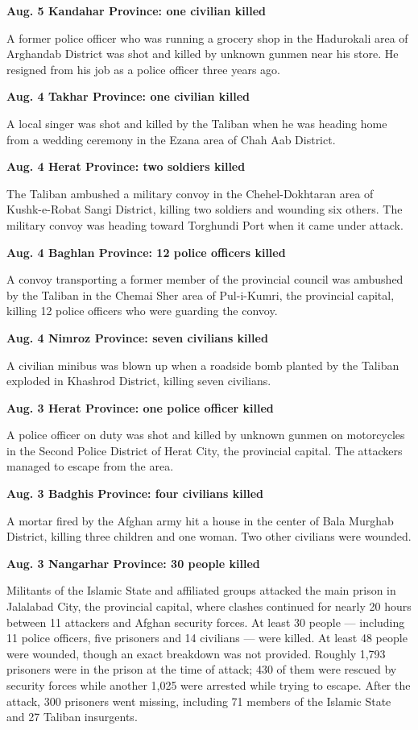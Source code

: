 \textbf{Aug. 5 Kandahar Province: one civilian killed}

A former police officer who was running a grocery shop in the Hadurokali
area of Arghandab District was shot and killed by unknown gunmen near
his store. He resigned from his job as a police officer three years ago.

\textbf{Aug. 4 Takhar Province: one civilian killed}

A local singer was shot and killed by the Taliban when he was heading
home from a wedding ceremony in the Ezana area of Chah Aab District.

\textbf{Aug. 4 Herat Province: two soldiers killed}

The Taliban ambushed a military convoy in the Chehel-Dokhtaran area of
Kushk-e-Robat Sangi District, killing two soldiers and wounding six
others. The military convoy was heading toward Torghundi Port when it
came under attack.

\textbf{Aug. 4 Baghlan Province: 12 police officers killed}

A convoy transporting a former member of the provincial council was
ambushed by the Taliban in the Chemai Sher area of Pul-i-Kumri, the
provincial capital, killing 12 police officers who were guarding the
convoy.

\textbf{Aug. 4 Nimroz Province: seven civilians killed}

A civilian minibus was blown up when a roadside bomb planted by the
Taliban exploded in Khashrod District, killing seven civilians.

\textbf{Aug. 3 Herat Province: one police officer killed}

A police officer on duty was shot and killed by unknown gunmen on
motorcycles in the Second Police District of Herat City, the provincial
capital. The attackers managed to escape from the area.

\textbf{Aug. 3 Badghis Province: four civilians killed}

A mortar fired by the Afghan army hit a house in the center of Bala
Murghab District, killing three children and one woman. Two other
civilians were wounded.

\textbf{Aug. 3 Nangarhar Province: 30 people killed}

Militants of the Islamic State and affiliated groups attacked the main
prison in Jalalabad City, the provincial capital, where clashes
continued for nearly 20 hours between 11 attackers and Afghan security
forces. At least 30 people --- including 11 police officers, five
prisoners and 14 civilians --- were killed. At least 48 people were
wounded, though an exact breakdown was not provided. Roughly 1,793
prisoners were in the prison at the time of attack; 430 of them were
rescued by security forces while another 1,025 were arrested while
trying to escape. After the attack, 300 prisoners went missing,
including 71 members of the Islamic State and 27 Taliban insurgents.

